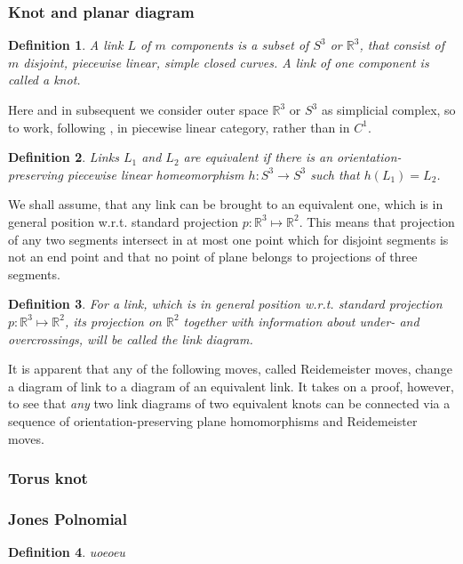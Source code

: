 \documentclass[10pt]{article} %
\newtheorem{definition}{Definition}[section]
\theoremstyle{remark}
\begin{document}
\subsubsection{Knot and planar diagram}
\begin{definition}A link $L$ of $m$ components is a subset of $S^3$ or $\mathbb{R}^3$, that consist of $m$ disjoint, piecewise linear, simple
closed curves. A link of one component is called a knot.\end{definition}
Here and in subsequent we consider outer space $\mathbb{R}^3$ or $S^3$ as simplicial complex, so to work, following \cite{lickorish},
in piecewise linear category, rather than in $C^1$.
\begin{definition} Links $L_1$ and $L_2$ are equivalent if there is an orientation-preserving piecewise linear homeomorphism $h:S^3\to S^3$
such that $h(L_1)=L_2$.
\end{definition}
We shall assume, that any link can be brought to an equivalent one, which is in general position w.r.t. standard projection $p:\mathbb{R}^3\mapsto
\mathbb{R}^2$. This means that projection of any two segments intersect in at most one point which for disjoint segments is not an end point
and that no point of plane belongs to projections of three segments.
\begin{definition}
For a link, which is in general position w.r.t. standard projection $p:\mathbb{R}^3\mapsto\mathbb{R}^2$, its projection on $\mathbb{R}^2$
together with information about under- and overcrossings, will be called the link diagram.
\end{definition}
It is apparent that any of the following moves, called Reidemeister moves, change a diagram of link to a diagram of an equivalent link.
It takes on a proof, however, to see that \textit{any} two link diagrams of two equivalent knots can be connected via a sequence of 
orientation-preserving plane homomorphisms and Reidemeister moves.
\subsubsection{Torus knot}

\subsubsection{Jones Polnomial}
\begin{definition}uoeoeu\end{definition}
\end{document}
